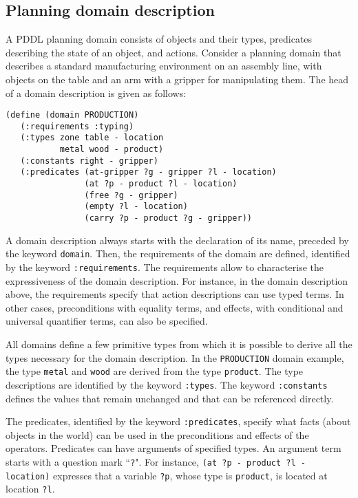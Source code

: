 \subsection{Planning domain description}\label{subsec:Planning domain description}
A PDDL planning domain consists of objects and their types, predicates describing the state of an object, and actions. Consider a planning domain that describes a standard manufacturing environment on an assembly line, with objects on the table and an arm with a gripper for manipulating them.
The head of a domain description is given as follows:
\begin{verbatim}
(define (domain PRODUCTION)
   (:requirements :typing)
   (:types zone table - location
           metal wood - product)
   (:constants right - gripper)
   (:predicates (at-gripper ?g - gripper ?l - location)
                (at ?p - product ?l - location)
                (free ?g - gripper)
                (empty ?l - location)
                (carry ?p - product ?g - gripper))
\end{verbatim}
\noindent
A domain description always starts with the declaration of its name, preceded by the keyword \texttt{domain}. Then, the requirements of the domain are defined, identified by the keyword \texttt{:requirements}. The requirements allow to characterise the expressiveness of the domain description. For instance, in the domain description above, the requirements specify that action descriptions can use typed terms. In other cases, preconditions with equality terms, and effects, with conditional and universal quantifier terms, can also be specified. 

All domains define a few primitive types from which it is possible to derive all the types necessary for the domain description. In the \texttt{PRODUCTION} domain example, the type \texttt{metal} and \texttt{wood} are derived from the type \texttt{product}. The type descriptions are identified by the keyword \texttt{:types}. The keyword \texttt{:constants} defines the values that remain unchanged and that can be referenced directly.

The predicates, identified by the keyword \texttt{:predicates}, specify what facts (about objects in the world) can be used in the preconditions and effects of the operators. Predicates can have arguments of specified types. An argument term starts with a question mark ``\texttt{?}". For instance, \texttt{(at ?p - product ?l - location)} expresses that a variable \texttt{?p}, whose type is \texttt{product}, is located at location \texttt{?l}.

